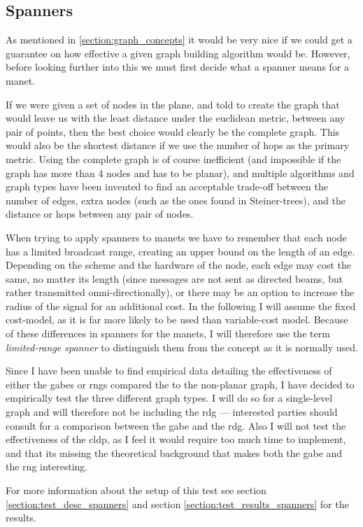 
\subsection{Spanners}
\label{section:spanners}
As mentioned in \ref{section:graph_concepts} it would be very nice if we could get a guarantee on how effective a given graph building algorithm would be. However, before looking further into this we must first decide what a spanner means for a \ac{manet}.

If we were given a set of nodes in the plane, and told to create the graph that would leave us with the least distance under the euclidean metric, between any pair of points, then the best choice would clearly be the complete graph. This would also be the shortest distance if we use the number of hops as the primary metric. Using the complete graph is of course inefficient (and impossible if the graph has more than 4 nodes and has to be planar), and multiple algorithms and graph types have been invented to find an acceptable trade-off between the number of edges, extra nodes (such as the ones found in Steiner-trees), and the distance or hops between any pair of nodes.

When trying to apply spanners to \acp{manet} we have to remember that each node has a limited broadcast range, creating an upper bound on the length of an edge. Depending on the scheme and the hardware of the node, each edge may cost the same, no matter its length (since messages are not sent as directed beams, but rather transmitted omni-directionally), or there may be an option to increase the radius of the signal for an additional cost. In the following I will assume the fixed cost-model, as it is far more likely to be used than variable-cost model. Because of these differences in spanners for the \acp{manet}, I will therefore use the term \emph{limited-range spanner} to distinguish them from the concept as it is normally used. 

Since I have been unable to find empirical data detailing the effectiveness of either the \acp{gabe} or \acp{rng} compared the to the non-planar graph, I have decided to empirically test the three different graph types. I will do so for a single-level graph and will therefore not be including the \ac{rdg} --- interested parties should consult \cite{GeoSpanners} for a comparison between the \ac{gabe} and the \ac{rdg}. Also I will not test the effectiveness of the \ac{cldp}, as I feel it would require too much time to implement, and that its missing the theoretical background that makes both the \ac{gabe} and the \ac{rng} interesting.

For more information about the setup of this test see section \ref{section:test_desc_spanners} and section \ref{section:test_results_spanners} for the results.
